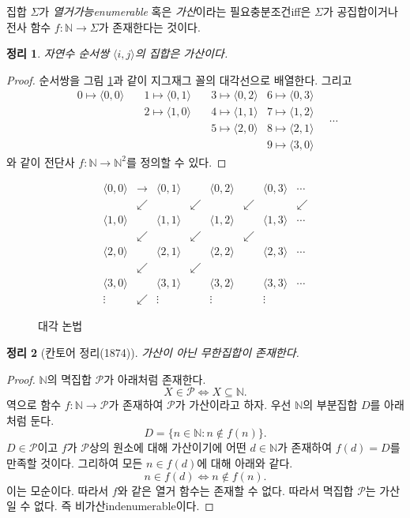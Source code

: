 \documentclass[a4paper,chapter,atbegshi]{oblivoir}
\newtheorem{theo}{정리}[chapter]
\begin{document}
집합 $\Sigma$가 \emph{열거가능\tiny enumerable} 혹은 \emph{가산}이라는
필요충분조건{\tiny iff}은 $\Sigma$가 공집합이거나 전사 함수 $f:\mathbb{N}
\rightarrow\Sigma$가 존재한다는 것이다. 
\begin{theo}\label{theo:11}
  자연수 순서쌍 $\langle i,j\rangle$의 집합은 가산이다.
\end{theo}
\begin{proof}
  순서쌍을 그림 \ref{fig:11}과 같이 지그재그 꼴의 대각선으로 배열한다.
  그리고
  \[
  \begin{matrix}
     0\mapsto\langle0,0\rangle\quad
     &1\mapsto\langle0,1\rangle\quad
     &3\mapsto\langle0,2\rangle
     &6\mapsto\langle0,3\rangle\\
     &2\mapsto\langle1,0\rangle\quad
     &4\mapsto\langle1,1\rangle
     &7\mapsto\langle1,2\rangle\\
     &&5\mapsto\langle2,0\rangle
     &8\mapsto\langle 2,1\rangle\\
     &&&9\mapsto\langle3,0\rangle
  \end{matrix}
  \quad\cdots
  \]
  와 같이 전단사 $f:\mathbb{N}\rightarrow\mathbb{N}^2$를 정의할 수 있다.
\end{proof}
\begin{figure}[h]
\[
\begin{matrix}
\langle 0,0\rangle &\rightarrow &\langle 0,1\rangle & &\langle0,2\rangle & &\langle 0,3\rangle &\cdots \\
&\swarrow & &\swarrow & &\swarrow & &\swarrow \\
\langle 1,0\rangle & &\langle 1,1\rangle & &\langle 1,2\rangle &&\langle1,3\rangle&\cdots \\
&\swarrow &&\swarrow &&\swarrow && \\
\langle2,0\rangle&&\langle2,1\rangle&&\langle2,2\rangle&&\langle2,3\rangle&\cdots\\
&\swarrow&&\swarrow&&&&\\
\langle3,0\rangle&&\langle3,1\rangle&&\langle3,2\rangle&&\langle3,3\rangle&\cdots\\
\vdots&\swarrow&\vdots&&\vdots&&\vdots&
\end{matrix}
\]
\caption{\label{fig:11}대각 논법}
\end{figure}
\begin{theo}[칸토어 정리(1874)]\label{theo:12}
  가산이 아닌 무한집합이 존재한다.
\end{theo}
\begin{proof}
  $\mathbb{N}$의 멱집합 $\mathcal{P}$가 아래처럼 존재한다.
  \[
    X\in\mathcal{P}\iff X\subseteq\mathbb{N}.
  \]
  역으로 함수 $f:\mathbb{N}\rightarrow\mathcal{P}$가 존재하여
  $\mathcal{P}$가 가산이라고 하자. 우선 $\mathbb{N}$의 부분집합 $D$를 아래처럼
  둔다.
  \[
    D=\{n\in\mathbb{N}:n\notin f(n)\}.
  \]
  $D\in\mathcal{P}$이고 $f$가 $\mathcal{P}$상의 원소에 대해 가산이기에 어떤
  $d\in\mathbb{N}$가 존재하여 $f(d)=D$를 만족할 것이다. 그리하여 모든 $n\in 
  f(d)$에 대해 아래와 같다. 
  \[
    n\in f(d) \iff n \notin f(n).
  \]
  이는 모순이다. 따라서 $f$와 같은 열거 함수는 존재할 수 없다. 따라서
  멱집합 $\mathcal{P}$는 가산일 수 없다. 즉 비가산{\tiny indenumerable}이다. 
\end{proof}
\end{document}
